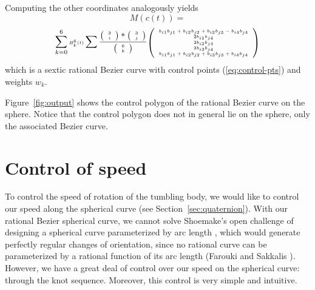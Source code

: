 Computing the other coordinates analogously yields
\[ M(c(t)) = 
\]
\[ \sum_{k=0}^6 \mbox{\tiny{$B_k^6(t)$}}
	\sum \frac{\mbox{\tiny{$\left( \begin{array}{c} 3 \\ i \end{array} \right)$}} * \mbox{\tiny{$\left( \begin{array}{c} 3 \\ j \end{array} \right)$}}}{\mbox{\tiny{$\left( \begin{array}{c} 6 \\ k \end{array} \right)$}}}
	\mbox{\tiny{$\left( \begin{array}{c}
            b_{i1} b_{j1} + b_{i2} b_{j2} + b_{i3} b_{j3} - b_{i4} b_{j4} \\
            2b_{i1} b_{j4} \\
            2b_{i2} b_{j4} \\
            2b_{i3} b_{j4} \\
            b_{i1} b_{j1} + b_{i2} b_{j2} + b_{i3} b_{j3} + b_{i4} b_{j4}
	\end{array} \right)$}} \]
%
which is a sextic rational Bezier curve with 
control points (\ref{eq:control-pts}) and weights $w_k$.
\QED

Figure~\ref{fig:output} shows the control polygon of 
the rational Bezier curve on the sphere.  
Notice that the control polygon does not in general
lie on the sphere, only the associated Bezier curve.

\section{Control of speed}
\label{sec:speed}

To control the speed of rotation of the tumbling body,
we would like to control our speed along the spherical curve
(see Section~\ref{sec:quaternion}).
With our rational Bezier spherical curve, we cannot solve
Shoemake's open challenge of designing a spherical curve
parameterized by arc length \cite{shoemake85},
which would generate perfectly regular changes of orientation,
since no rational curve can be parameterized by a rational function
of its arc length (Farouki and Sakkalis \cite{farouki91}).
However, we have a great deal of control over our speed on the
spherical curve: through the knot sequence.
Moreover, this control is very simple and intuitive.

